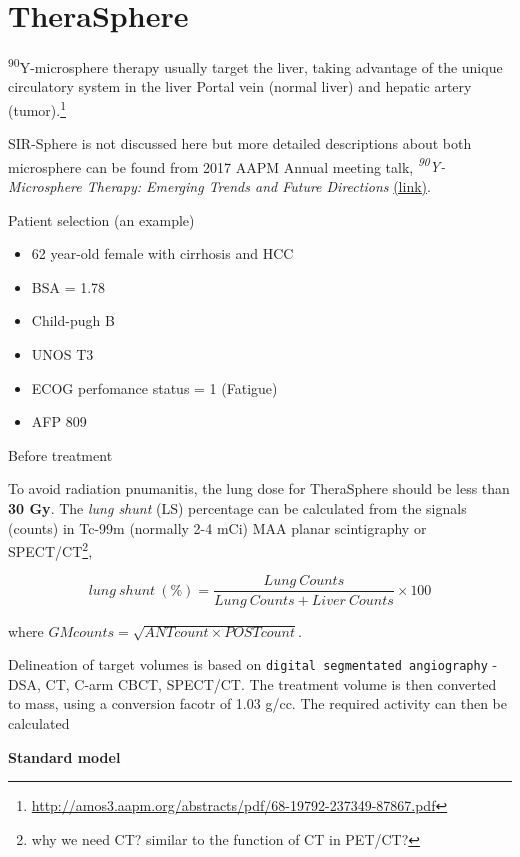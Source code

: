\documentclass[]{book}
\providecommand{\tightlist}{%
  \setlength{\itemsep}{0pt}\setlength{\parskip}{0pt}}
\let\rmarkdownfootnote\footnote%
\def\footnote{\protect\rmarkdownfootnote}
\theoremstyle{definition}
\theoremstyle{definition}
\theoremstyle{definition}
\theoremstyle{remark}
\begin{document}
\section{TheraSphere}\label{y90}

\textsuperscript{90}Y-microsphere therapy usually target the liver,
taking advantage of the unique circulatory system in the liver Portal
vein (normal liver) and hepatic artery (tumor).\footnote{\url{http://amos3.aapm.org/abstracts/pdf/68-19792-237349-87867.pdf}}

SIR-Sphere is not discussed here but more detailed descriptions about
both microsphere can be found from 2017 AAPM Annual meeting talk,
\emph{\textsuperscript{90}Y-Microsphere Therapy: Emerging Trends and
Future Directions}
\href{https://www.aapm.org/education/vl/vl.asp?id=12296}{(link)}.

Patient selection (an example)

\begin{itemize}
\tightlist
\item
  62 year-old female with cirrhosis and HCC
\item
  BSA = 1.78
\item
  Child-pugh B
\item
  UNOS T3
\item
  ECOG perfomance status = 1 (Fatigue)
\item
  AFP 809
\end{itemize}

Before treatment

To avoid radiation pnumanitis, the lung dose for TheraSphere should be
less than \textbf{30 Gy}. The \emph{lung shunt} (LS) percentage can be
calculated from the signals (counts) in Tc-99m (normally 2-4 mCi) MAA
planar scintigraphy or SPECT/CT\footnote{why we need CT? similar to the
  function of CT in PET/CT?},

\begin{equation}
  lung\ shunt\ (\%) = \frac{Lung\ Counts}{Lung\ Counts+Liver\ Counts}\times 100
  \label{eq:ls}
\end{equation}

where \(GM counts= \sqrt{ANT{count}\times POST{count}}\).

Delineation of target volumes is based on
\texttt{digital\ segmentated\ angiography} - DSA, CT, C-arm CBCT,
SPECT/CT. The treatment volume is then converted to mass, using a
conversion facotr of 1.03 g/cc. The required activity can then be
calculated

\textbf{Standard model}
\end{document}

